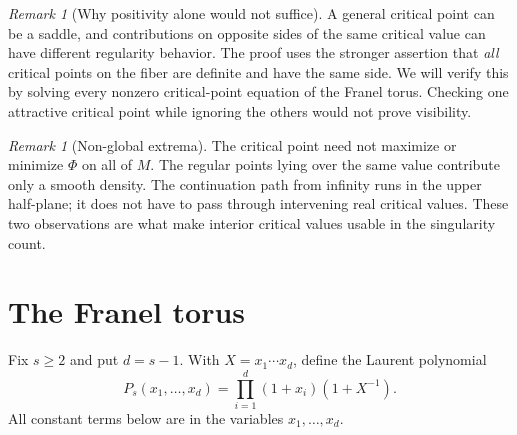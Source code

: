 \documentclass[11pt,a4paper]{article}
\theoremstyle{definition}\newtheorem{definition}[theorem]{Definition}
\theoremstyle{remark}\newtheorem{remark}[theorem]{Remark}
\begin{document}
\begin{remark}[Why positivity alone would not suffice]\label{rem:cancellation}
A general critical point can be a saddle, and contributions on opposite sides
of the same critical value can have different regularity behavior. The proof
uses the stronger assertion that \emph{all} critical points on the fiber are
definite and have the same side. We will verify this by solving every nonzero
critical-point equation of the Franel torus. Checking one attractive critical
point while ignoring the others would not prove visibility.
\end{remark}

\begin{remark}[Non-global extrema]
The critical point need not maximize or minimize $\Phi$ on all of $M$.
The regular points lying over the same value contribute only a smooth density.
The continuation path from infinity runs in the upper half-plane; it does not
have to pass through intervening real critical values. These two observations
are what make interior critical values usable in the singularity count.
\end{remark}

\section{The Franel torus}\label{sec:torus}
Fix $s\ge2$ and put $d=s-1$. With $X=x_1\cdots x_d$, define the Laurent
polynomial
\begin{equation}\label{eq:Ps}
 P_s(x_1,\ldots,x_d)=\prod_{i=1}^{d}(1+x_i)(1+X^{-1}).
\end{equation}
All constant terms below are in the variables $x_1,\ldots,x_d$.
\end{document}

